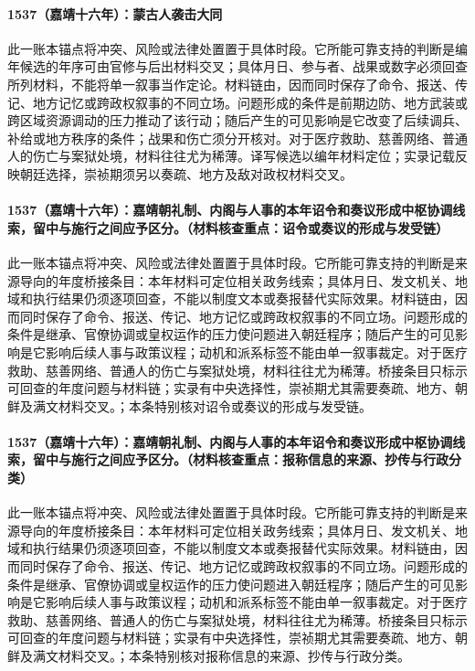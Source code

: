 \paragraph{1537（嘉靖十六年）：蒙古人袭击大同} 此一账本锚点将冲突、风险或法律处置置于具体时段。它所能可靠支持的判断是编年候选的年序可由官修与后出材料交叉；具体月日、参与者、战果或数字必须回查所列材料，不能将单一叙事当作定论。材料链由，因而同时保存了命令、报送、传记、地方记忆或跨政权叙事的不同立场。问题形成的条件是前期边防、地方武装或跨区域资源调动的压力推动了该行动；随后产生的可见影响是它改变了后续调兵、补给或地方秩序的条件；战果和伤亡须分开核对。对于医疗救助、慈善网络、普通人的伤亡与案狱处境，材料往往尤为稀薄。译写候选以编年材料定位；实录记载反映朝廷选择，崇祯期须另以奏疏、地方及敌对政权材料交叉。

\paragraph{1537（嘉靖十六年）：嘉靖朝礼制、内阁与人事的本年诏令和奏议形成中枢协调线索，留中与施行之间应予区分。（材料核查重点：诏令或奏议的形成与发受链）} 此一账本锚点将冲突、风险或法律处置置于具体时段。它所能可靠支持的判断是来源导向的年度桥接条目：本年材料可定位相关政务线索；具体月日、发文机关、地域和执行结果仍须逐项回查，不能以制度文本或奏报替代实际效果。材料链由，因而同时保存了命令、报送、传记、地方记忆或跨政权叙事的不同立场。问题形成的条件是继承、官僚协调或皇权运作的压力使问题进入朝廷程序；随后产生的可见影响是它影响后续人事与政策议程；动机和派系标签不能由单一叙事裁定。对于医疗救助、慈善网络、普通人的伤亡与案狱处境，材料往往尤为稀薄。桥接条目只标示可回查的年度问题与材料链；实录有中央选择性，崇祯期尤其需要奏疏、地方、朝鲜及满文材料交叉。；本条特别核对诏令或奏议的形成与发受链。

\paragraph{1537（嘉靖十六年）：嘉靖朝礼制、内阁与人事的本年诏令和奏议形成中枢协调线索，留中与施行之间应予区分。（材料核查重点：报称信息的来源、抄传与行政分类）} 此一账本锚点将冲突、风险或法律处置置于具体时段。它所能可靠支持的判断是来源导向的年度桥接条目：本年材料可定位相关政务线索；具体月日、发文机关、地域和执行结果仍须逐项回查，不能以制度文本或奏报替代实际效果。材料链由，因而同时保存了命令、报送、传记、地方记忆或跨政权叙事的不同立场。问题形成的条件是继承、官僚协调或皇权运作的压力使问题进入朝廷程序；随后产生的可见影响是它影响后续人事与政策议程；动机和派系标签不能由单一叙事裁定。对于医疗救助、慈善网络、普通人的伤亡与案狱处境，材料往往尤为稀薄。桥接条目只标示可回查的年度问题与材料链；实录有中央选择性，崇祯期尤其需要奏疏、地方、朝鲜及满文材料交叉。；本条特别核对报称信息的来源、抄传与行政分类。

